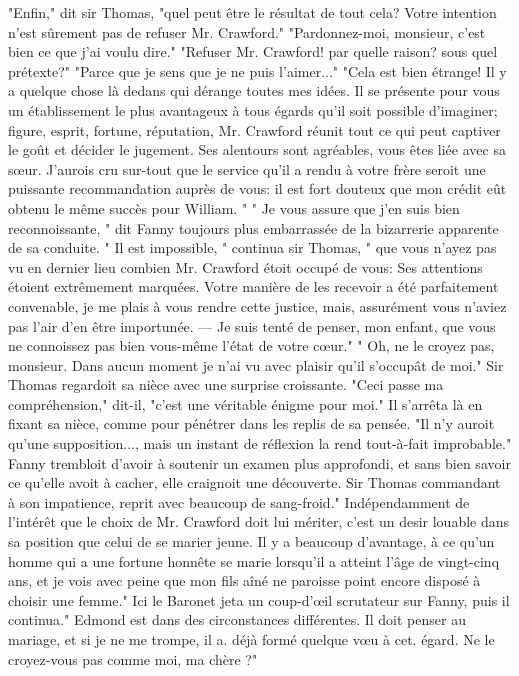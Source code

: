 "Enfin," dit sir Thomas, "quel peut être le résultat de tout cela? Votre intention n'est sûrement pas de refuser Mr. Crawford."
"Pardonnez-moi, monsieur, c'est bien ce que j'ai voulu dire."
"Refuser Mr. Crawford! par quelle raison? sous quel prétexte?"
"Parce que je sens que je ne puis l'aimer..."
"Cela est bien étrange! Il y a quelque chose là dedans qui dérange toutes mes idées. Il se présente pour vous un établissement le\setcounter{page}{268} plus avantageux à tous égards qu'il soit possible d'imaginer; figure, esprit, fortune, réputation, Mr. Crawford réunit tout ce qui peut captiver le goût et décider le jugement. Ses alentours sont agréables, vous êtes liée avec sa sœur. J'aurois cru sur-tout que le service qu'il a rendu à votre frère seroit une puissante recommandation auprès de vous: il est fort douteux que mon crédit eût obtenu le même succès pour William. "
" Je vous assure que j'en suis bien reconnoissante, " dit Fanny toujours plus embarrassée de la bizarrerie apparente de sa conduite.
" Il est impossible, " continua sir Thomas, " que vous n'ayez pas vu en dernier lieu combien Mr. Crawford étoit occupé de vous: Ses attentions étoient extrêmement marquées. Votre manière de les recevoir a été parfaitement convenable, je me plais à vous rendre cette justice, mais, assurément vous n'aviez pas l'air d'en être importunée. — Je suis tenté de penser, mon enfant, que vous ne connoissez pas bien vous-même l'état de votre cœur."
" Oh, ne le croyez pas, monsieur. Dans aucun moment je n'ai vu avec plaisir qu'il s'occupât de moi."\setcounter{page}{269} Sir Thomas regardoit sa nièce avec une surprise croissante. "Ceci passe ma compréhension," dit-il, "c'est une véritable énigme pour moi."
Il s'arrêta là en fixant sa nièce, comme pour pénétrer dans les replis de sa pensée. "Il n'y auroit qu'une supposition..., mais un instant de réflexion la rend tout-à-fait improbable."
Fanny trembloit d'avoir à soutenir un examen plus approfondi, et sans bien savoir ce qu'elle avoit à cacher, elle craignoit une découverte. Sir Thomas commandant à son impatience, reprit avec beaucoup de sang-froid." Indépendamment de l'intérêt que le choix de Mr. Crawford doit lui mériter, c'est un desir louable dans sa position que celui de se marier jeune. Il y a beaucoup d'avantage, à ce qu'un homme qui a une fortune honnête se marie lorsqu'il a atteint l'âge de vingt-cinq ans, et je vois avec peine que mon fils aîné ne paroisse point encore disposé à choisir une femme."
Ici le Baronet jeta un coup-d'œil scrutateur sur Fanny, puis il continua." Edmond est dans des circonstances différentes. Il doit penser au mariage, et si je ne me trompe, il a. déjà formé quelque vœu à cet. égard.\setcounter{page}{270} Ne le croyez-vous pas comme moi, ma chère ?"
